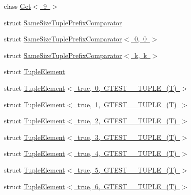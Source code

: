 \begin{DoxyCompactItemize}
class \mbox{\hyperlink{classstd_1_1tr1_1_1gtest__internal_1_1Get_3_019_01_4}{Get$<$ 9 $>$}}
\item 
struct \mbox{\hyperlink{structstd_1_1tr1_1_1gtest__internal_1_1SameSizeTuplePrefixComparator}{Same\+Size\+Tuple\+Prefix\+Comparator}}
\item 
struct \mbox{\hyperlink{structstd_1_1tr1_1_1gtest__internal_1_1SameSizeTuplePrefixComparator_3_010_00_010_01_4}{Same\+Size\+Tuple\+Prefix\+Comparator$<$ 0, 0 $>$}}
\item 
struct \mbox{\hyperlink{structstd_1_1tr1_1_1gtest__internal_1_1SameSizeTuplePrefixComparator_3_01k_00_01k_01_4}{Same\+Size\+Tuple\+Prefix\+Comparator$<$ k, k $>$}}
\item 
struct \mbox{\hyperlink{structstd_1_1tr1_1_1gtest__internal_1_1TupleElement}{Tuple\+Element}}
\item 
struct \mbox{\hyperlink{structstd_1_1tr1_1_1gtest__internal_1_1TupleElement_3_01true_00_010_00_01GTEST__10__TUPLE___07T_08_01_4}{Tuple\+Element$<$ true, 0, G\+T\+E\+S\+T\+\_\+\_\+\+T\+U\+P\+L\+E\+\_\+(\+T) $>$}}
\item 
struct \mbox{\hyperlink{structstd_1_1tr1_1_1gtest__internal_1_1TupleElement_3_01true_00_011_00_01GTEST__10__TUPLE___07T_08_01_4}{Tuple\+Element$<$ true, 1, G\+T\+E\+S\+T\+\_\+\_\+\+T\+U\+P\+L\+E\+\_\+(\+T) $>$}}
\item 
struct \mbox{\hyperlink{structstd_1_1tr1_1_1gtest__internal_1_1TupleElement_3_01true_00_012_00_01GTEST__10__TUPLE___07T_08_01_4}{Tuple\+Element$<$ true, 2, G\+T\+E\+S\+T\+\_\+\_\+\+T\+U\+P\+L\+E\+\_\+(\+T) $>$}}
\item 
struct \mbox{\hyperlink{structstd_1_1tr1_1_1gtest__internal_1_1TupleElement_3_01true_00_013_00_01GTEST__10__TUPLE___07T_08_01_4}{Tuple\+Element$<$ true, 3, G\+T\+E\+S\+T\+\_\+\_\+\+T\+U\+P\+L\+E\+\_\+(\+T) $>$}}
\item 
struct \mbox{\hyperlink{structstd_1_1tr1_1_1gtest__internal_1_1TupleElement_3_01true_00_014_00_01GTEST__10__TUPLE___07T_08_01_4}{Tuple\+Element$<$ true, 4, G\+T\+E\+S\+T\+\_\+\_\+\+T\+U\+P\+L\+E\+\_\+(\+T) $>$}}
\item 
struct \mbox{\hyperlink{structstd_1_1tr1_1_1gtest__internal_1_1TupleElement_3_01true_00_015_00_01GTEST__10__TUPLE___07T_08_01_4}{Tuple\+Element$<$ true, 5, G\+T\+E\+S\+T\+\_\+\_\+\+T\+U\+P\+L\+E\+\_\+(\+T) $>$}}
\item 
struct \mbox{\hyperlink{structstd_1_1tr1_1_1gtest__internal_1_1TupleElement_3_01true_00_016_00_01GTEST__10__TUPLE___07T_08_01_4}{Tuple\+Element$<$ true, 6, G\+T\+E\+S\+T\+\_\+\_\+\+T\+U\+P\+L\+E\+\_\+(\+T) $>$}}

\end{DoxyCompactItemize}
